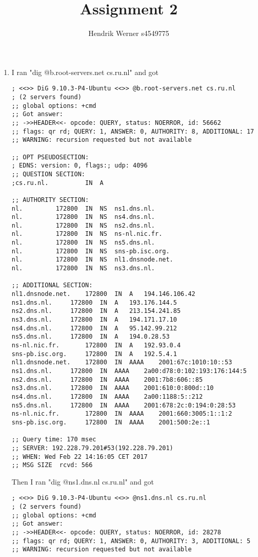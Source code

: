 \documentclass[12pt, a4paper]{article}
\title{Assignment 2}
\author{Hendrik Werner s4549775}
\begin{document}
\maketitle

\section{} %
\begin{enumerate}[a]
	\item %
	I ran "dig @b.root-servers.net cs.ru.nl" and got

	\begin{lstlisting}
; <<>> DiG 9.10.3-P4-Ubuntu <<>> @b.root-servers.net cs.ru.nl
; (2 servers found)
;; global options: +cmd
;; Got answer:
;; ->>HEADER<<- opcode: QUERY, status: NOERROR, id: 56662
;; flags: qr rd; QUERY: 1, ANSWER: 0, AUTHORITY: 8, ADDITIONAL: 17
;; WARNING: recursion requested but not available

;; OPT PSEUDOSECTION:
; EDNS: version: 0, flags:; udp: 4096
;; QUESTION SECTION:
;cs.ru.nl.			IN	A

;; AUTHORITY SECTION:
nl.			172800	IN	NS	ns1.dns.nl.
nl.			172800	IN	NS	ns4.dns.nl.
nl.			172800	IN	NS	ns2.dns.nl.
nl.			172800	IN	NS	ns-nl.nic.fr.
nl.			172800	IN	NS	ns5.dns.nl.
nl.			172800	IN	NS	sns-pb.isc.org.
nl.			172800	IN	NS	nl1.dnsnode.net.
nl.			172800	IN	NS	ns3.dns.nl.

;; ADDITIONAL SECTION:
nl1.dnsnode.net.	172800	IN	A	194.146.106.42
ns1.dns.nl.		172800	IN	A	193.176.144.5
ns2.dns.nl.		172800	IN	A	213.154.241.85
ns3.dns.nl.		172800	IN	A	194.171.17.10
ns4.dns.nl.		172800	IN	A	95.142.99.212
ns5.dns.nl.		172800	IN	A	194.0.28.53
ns-nl.nic.fr.		172800	IN	A	192.93.0.4
sns-pb.isc.org.		172800	IN	A	192.5.4.1
nl1.dnsnode.net.	172800	IN	AAAA	2001:67c:1010:10::53
ns1.dns.nl.		172800	IN	AAAA	2a00:d78:0:102:193:176:144:5
ns2.dns.nl.		172800	IN	AAAA	2001:7b8:606::85
ns3.dns.nl.		172800	IN	AAAA	2001:610:0:800d::10
ns4.dns.nl.		172800	IN	AAAA	2a00:1188:5::212
ns5.dns.nl.		172800	IN	AAAA	2001:678:2c:0:194:0:28:53
ns-nl.nic.fr.		172800	IN	AAAA	2001:660:3005:1::1:2
sns-pb.isc.org.		172800	IN	AAAA	2001:500:2e::1

;; Query time: 170 msec
;; SERVER: 192.228.79.201#53(192.228.79.201)
;; WHEN: Wed Feb 22 14:16:05 CET 2017
;; MSG SIZE  rcvd: 566
	\end{lstlisting}

	Then I ran "dig @ns1.dns.nl cs.ru.nl" and got

	\begin{lstlisting}
; <<>> DiG 9.10.3-P4-Ubuntu <<>> @ns1.dns.nl cs.ru.nl
; (2 servers found)
;; global options: +cmd
;; Got answer:
;; ->>HEADER<<- opcode: QUERY, status: NOERROR, id: 28278
;; flags: qr rd; QUERY: 1, ANSWER: 0, AUTHORITY: 3, ADDITIONAL: 5
;; WARNING: recursion requested but not available


\end{lstlisting}
\end{enumerate}
\end{document}
